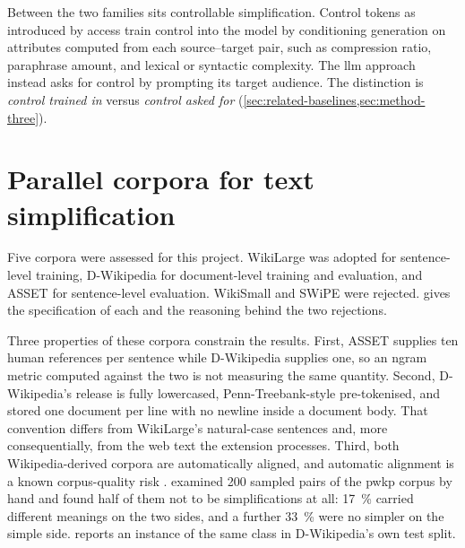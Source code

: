 Between the two families sits controllable simplification.
Control tokens as introduced by \gls{access} \parencite[4691]{martin-etal-2020-controllable} train control into the model by conditioning generation on attributes computed from each source--target pair, such as compression ratio, paraphrase amount, and lexical or syntactic complexity.
The \gls{llm} approach instead asks for control by prompting its target audience.
The distinction is \emph{control trained in} versus \emph{control asked for} (\cref{sec:related-baselines,sec:method-three}).

\section{Parallel corpora for text simplification}
\label{sec:background-corpora}

Five corpora were assessed for this project.
WikiLarge \parencite{zhang-lapata-2017-sentence} was adopted for sentence-level training, D-Wikipedia \parencite{sun-etal-2021-document} for document-level training and evaluation, and ASSET \parencite{alva-manchego-etal-2020-asset} for sentence-level evaluation.
WikiSmall \parencite{zhu-etal-2010-monolingual} and SWiPE \parencite{laban-etal-2023-swipe} were rejected.
 gives the specification of each and the reasoning behind the two rejections.

Three properties of these corpora constrain the results.
First, ASSET supplies ten human references per sentence \parencite[4671]{alva-manchego-etal-2020-asset} while D-Wikipedia supplies one, so an \gls{ngram} metric computed against the two is not measuring the same quantity.
Second, D-Wikipedia's release is fully lowercased, Penn-Treebank-style pre-tokenised, and stored one document per line with no newline inside a document body.
That convention differs from WikiLarge's natural-case sentences and, more consequentially, from the web text the extension processes.
Third, both Wikipedia-derived corpora are automatically aligned, and automatic alignment is a known corpus-quality risk \parencite[589]{zhang-lapata-2017-sentence}.
\textcite[285]{xu-etal-2015-problems} examined \num{200} sampled pairs of the \gls{pwkp} corpus by hand and found half of them not to be simplifications at all: \qty{17}{\percent} carried different meanings on the two sides, and a further \qty{33}{\percent} were no simpler on the simple side.
 reports an instance of the same class in D-Wikipedia's own test split.

